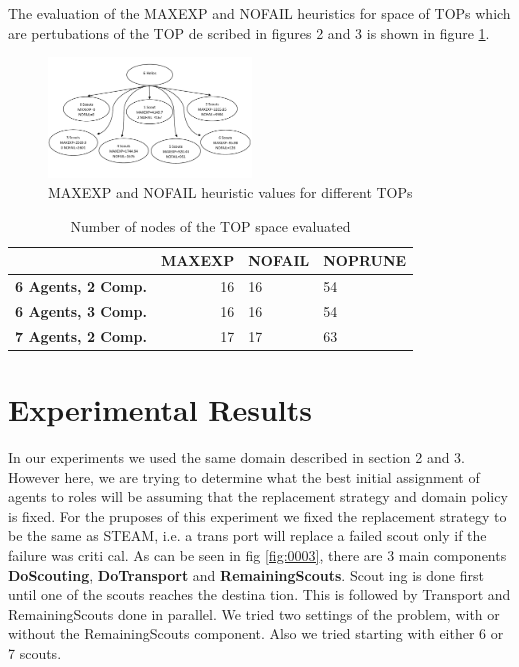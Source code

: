 \documentclass{IEEEtran}
\begin{document}
 The evaluation of the MAXEXP and NOFAIL heuristics
 for space of TOPs which are pertubations of the TOP de
scribed in figures 2 and 3 is shown in figure \ref{fig:0006}.

\begin{figure}[htb]
        \centering
        \includegraphics[width=0.48\textwidth]{figure0006.pdf}
        \caption{ MAXEXP and NOFAIL heuristic values for different TOPs}
        \label{fig:0006}
\end{figure} 
\begin{table}
        \centering
        \begin{tabular}{|c|r|l|l|}
        \hline
        \textbf{} & \textbf{MAXEXP} & \textbf{NOFAIL} & \textbf{NOPRUNE} \\ \hline\hline
        \textbf{6 Agents, 2 Comp.}    &    16   &    16     &   54\\
        \textbf{6 Agents, 3 Comp.}    &    16   &    16     &   54\\
        \textbf{7 Agents, 2 Comp.}    &    17   &    17     &   63\\  
        \hline
        \end{tabular}
        \caption{Number of nodes of the TOP space evaluated}
        \label{tabla1}
        \end{table}

\section{\textbf{ Experimental Results}}
In our experiments we used the same domain described in
 section 2 and 3. However here, we are trying to determine
 what the best initial assignment of agents to roles will be
 assuming that the replacement strategy and domain policy
 is fixed. For the pruposes of this experiment we fixed the
 replacement strategy to be the same as STEAM, i.e. a trans
port will replace a failed scout only if the failure was criti
cal. As can be seen in fig \ref{fig:0003}, there are 3 main components
\textbf{DoScouting}, \textbf{DoTransport} and \textbf{RemainingScouts}. Scout
ing is done first until one of the scouts reaches the destina
tion. This is followed by Transport and RemainingScouts
 done in parallel. We tried two settings of the problem, with
 or without the RemainingScouts component. Also we tried
 starting with either 6 or 7 scouts.
\end{document}
